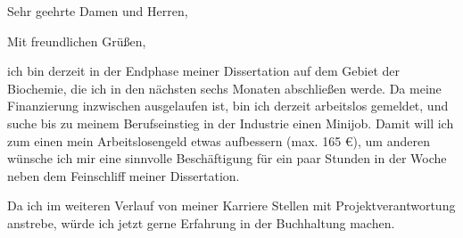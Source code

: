 

\date{\today}
\opening{Sehr geehrte Damen und Herren,}
\closing{Mit freundlichen Grüßen,}
{}
\makelettertitle
\justifying

ich bin derzeit in der Endphase meiner Dissertation auf dem Gebiet der Biochemie, die ich in den nächsten sechs Monaten abschließen werde. Da meine Finanzierung inzwischen ausgelaufen ist, bin ich derzeit arbeitslos gemeldet, und suche bis zu meinem Berufseinstieg in der Industrie einen Minijob. Damit will ich zum einen mein Arbeitslosengeld etwas aufbessern (max. 165 \euro), um anderen wünsche ich mir eine sinnvolle Beschäftigung für ein paar Stunden in der Woche neben dem Feinschliff meiner Dissertation.\par
Da ich im weiteren Verlauf von meiner Karriere Stellen mit Projektverantwortung anstrebe, würde ich jetzt gerne Erfahrung in der Buchhaltung machen.


\makeletterclosing

